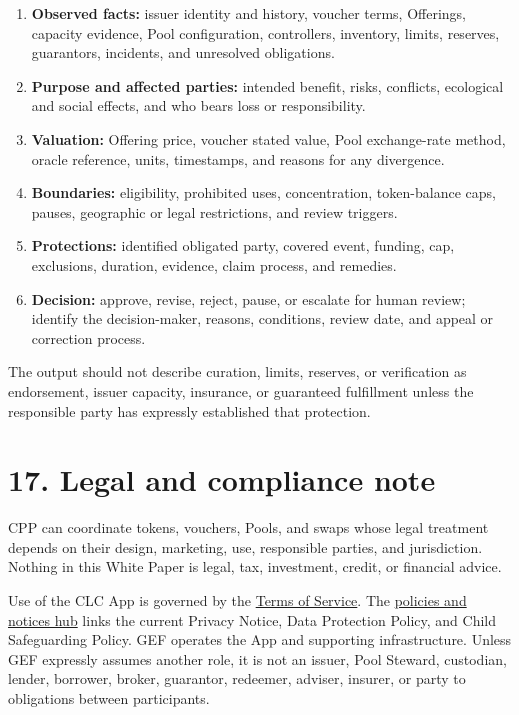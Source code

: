 \documentclass[11pt]{article}
\begin{document}
\begin{enumerate}[leftmargin=*]
\item \textbf{Observed facts:} issuer identity and history, voucher terms, Offerings, capacity evidence, Pool configuration, controllers, inventory, limits, reserves, guarantors, incidents, and unresolved obligations.
\item \textbf{Purpose and affected parties:} intended benefit, risks, conflicts, ecological and social effects, and who bears loss or responsibility.
\item \textbf{Valuation:} Offering price, voucher stated value, Pool exchange-rate method, oracle reference, units, timestamps, and reasons for any divergence.
\item \textbf{Boundaries:} eligibility, prohibited uses, concentration, token-balance caps, pauses, geographic or legal restrictions, and review triggers.
\item \textbf{Protections:} identified obligated party, covered event, funding, cap, exclusions, duration, evidence, claim process, and remedies.
\item \textbf{Decision:} approve, revise, reject, pause, or escalate for human review; identify the decision-maker, reasons, conditions, review date, and appeal or correction process.
\end{enumerate}
The output should not describe curation, limits, reserves, or verification as endorsement, issuer capacity, insurance, or guaranteed fulfillment unless the responsible party has expressly established that protection.


\section*{17. Legal and compliance note}

CPP can coordinate tokens, vouchers, Pools, and swaps whose legal treatment depends on their design, marketing, use, responsible parties, and jurisdiction. Nothing in this White Paper is legal, tax, investment, credit, or financial advice.

Use of the CLC App is governed by the \href{https://docs.cosmolocal.credit/governance/terms}{Terms of Service}. The \href{https://docs.cosmolocal.credit/governance/policies}{policies and notices hub} links the current Privacy Notice, Data Protection Policy, and Child Safeguarding Policy. GEF operates the App and supporting infrastructure. Unless GEF expressly assumes another role, it is not an issuer, Pool Steward, custodian, lender, borrower, broker, guarantor, redeemer, adviser, insurer, or party to obligations between participants.
\end{document}

